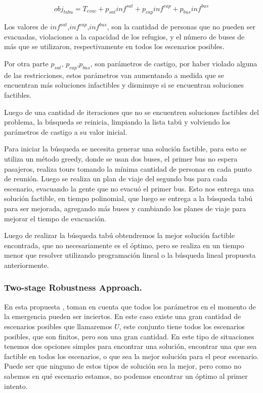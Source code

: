 \documentclass[letter, 10pt]{article}
\begin{document}
$$ obj_{tabu} = T_{evac} +  p_{sat} inf^{sat} + p_{cap} inf^{cap} + p_{bus} inf^{bus}$$

Los valores de $ inf^{sat}$,$ inf^{cap}$,$ inf^{bus}$, son la cantidad de personas que no pueden ser evacuadas, violaciones a la capacidad de los refugios, y el número de buses de más que se utilizaron, respectivamente en todos los escenarios posibles.

Por otra parte  $p_{sat}$, $ p_{cap}$,$ p_{bus}$, son parámetros de castigo, por haber violado alguna de las restricciones, estos parámetros van aumentando a medida que se encuentran más soluciones infactibles y disminuye si se encuentran soluciones factibles.

Luego de una cantidad de iteraciones que no se encuentren soluciones factibles del problema, la búsqueda se reinicia, limpiando la lista tabú y volviendo los parámetros de castigo a su valor inicial.

Para iniciar la búsqueda se necesita generar una solución factible, para esto se utiliza un método greedy, donde se usan dos buses, el primer bus no espera pasajeros, realiza tours tomando la mínima cantidad de personas en cada punto de reunión. Luego se realiza un plan de viaje del segundo bus para cada escenario, evacuando la gente que no evacuó el primer bus. Esto nos entrega una solución factible, en tiempo polinomial, que luego se entrega a la búsqueda tabú para ser mejorada, agregando más buses y cambiando los planes de viaje para mejorar el tiempo de evacuación.

Luego de realizar la búsqueda tabú obtendremos la mejor solución factible encontrada, que no necesariamente es el óptimo, pero se realiza en un tiempo menor que resolver utilizando programación lineal o la búsqueda lineal propuesta anteriormente.

\subsubsection{Two-stage Robustness Approach.}

En esta propuesta \cite{goerigk2013two}, toman en cuenta que todos los parámetros en el momento de la emergencia pueden ser inciertos. En este caso existe una gran cantidad de escenarios posibles que llamaremos $U$, este conjunto tiene todos los escenarios posibles, que son finitos, pero son una gran cantidad. En este tipo de situaciones tenemos dos opciones simples para encontrar una solución, encontrar una que sea factible en todos los escenarios, o que sea la mejor solución para el peor escenario. Puede ser que ninguno de estos tipos de solución sea la mejor, pero como no sabemos en qué escenario estamos, no podemos encontrar un óptimo al primer intento. 
\end{document}
